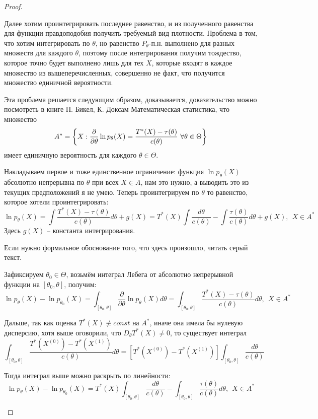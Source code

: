 \begin{proof}
\begin{itemize}
        Далее хотим проинтегрировать последнее равенство, и из полученного равенства для функции правдоподобия получить требуемый вид плотности. Проблема в том, что хотим интегрировать по $\theta$, но равенство $P_\theta \text{-п.н.}$ выполнено для разных множеств для каждого $\theta$, поэтому после интегрирования получим тождество, которое точно будет выполнено лишь для тех $X$, которые входят в каждое множество из вышеперечисленных, совершенно не факт, что получится множество единичной вероятности.

        Эта проблема решается следующим образом, доказывается, доказательство можно посмотреть в книге П. Бикел, К. Доксам Математическая статистика, что множество
        \[
            A^* = \left\{X : \frac{\partial}{\partial \theta} \ln p_\theta(X) = \frac{T^*(X)-\tau(\theta)}{c(\theta)} \ \forall \theta \in \Theta\right\}
        \]
        имеет единичную вероятность для каждого $\theta \in \Theta$.

        Накладываем первое и тоже единственное ограничение: функция $\ln p_\theta(X)$ абсолютно непрерывна по $\theta$ при всех $X \in A$, нам это нужно, а выводить это из текущих предположений я не умею. Теперь проинтегрируем по $\theta$ то равенство, которое хотели проинтегрировать:
        \[
            \ln p_\theta(X) = \int \frac{T^*(X)-\tau(\theta)}{c(\theta)} d\theta + g(X) = T^*(X) \int \frac{d\theta}{c(\theta)} - \int \frac{\tau(\theta)}{c(\theta)} d\theta + g(X),\ \ X \in A^*
        \]
        Здесь $g(X)$ -- константа интегрирования.

        Если нужно формальное обоснование того, что здесь произошло, читать серый текст.

        \color{gray}
        Зафиксируем $\theta_0 \in \Theta$, возьмём интеграл Лебега от абсолютно непрерывной функции на $[\theta_0, \theta]$, получим:
        \[
            \ln p_\theta(X) - \ln p_{\theta_0}(X) = \int_{[\theta_0, \theta]} \frac{\partial}{\partial \theta} \ln p_\theta(X) d\theta = \int_{[\theta_0, \theta]} \frac{T^*(X)-\tau(\theta)}{c(\theta)} d\theta,\ \ X \in A^*
        \]

        Дальше, так как оценка $T^*(X) \not\equiv const$ на $A^*$, иначе она имела бы нулевую дисперсию, хотя выше оговорили, что $D_\theta T^*(X) \neq 0$, то существует интеграл
        \[
            \int_{[\theta_0, \theta]} \frac{T^*(X^{(0)})-T^*(X^{(1)})}{c(\theta)} d\theta = [T^*(X^{(0)})-T^*(X^{(1)})] \int_{[\theta_0, \theta]} \frac{d\theta}{c(\theta)}
        \]

        Тогда интеграл выше можно раскрыть по линейности:
        \[
            \ln p_\theta(X) - \ln p_{\theta_0}(X) = T^*(X) \int_{[\theta_0, \theta]} \frac{d\theta}{c(\theta)} - \int_{[\theta_0, \theta]} \frac{\tau(\theta)}{c(\theta)} d\theta,\ \ X \in A^*
        \]


\end{itemize}
\end{proof}
